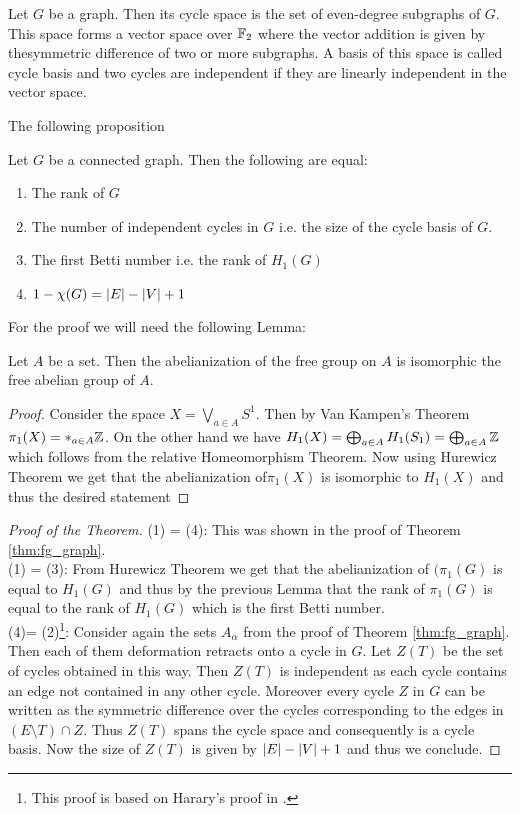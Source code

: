\begin{definition}
	Let $G$ be a graph. Then its cycle space is the set of even-degree subgraphs of $G$. 
	This space forms a vector space over $\mathbb{F}_2$ where the vector addition is given by thesymmetric difference of two or more subgraphs.
	A basis of this space is called cycle basis and two cycles are independent if they are linearly independent in the vector space.
\end{definition}

The following proposition 
\begin{proposition}\label{prop:rank}
	Let $G$ be a connected graph. Then the following are equal:
	\begin{enumerate}
		\item The rank of $G$
		\item The number of independent cycles in $G$ i.e. the size of the cycle basis of $G$.
		\item The first Betti number i.e. the rank of $H_{1}(G)$
		\item $1 - \chi(G) = \abs{E} - \abs{V} + 1$
	\end{enumerate}
\end{proposition}

For the proof we will need the following Lemma:
\begin{lemma}
	Let $A$ be a set. Then the abelianization of the free group on $A$ is isomorphic the free abelian group of $A$.
\end{lemma}

\begin{proof}
	Consider the space $X = \bigvee_{a \in A} S^{1}$. Then by Van Kampen's Theorem $\pi_1(X) = *_{a \in A} \mathbb{Z}$.
	On the other hand we have $H_1(X) = \bigoplus_{a \in A} H_1(S_1) = \bigoplus_{a \in A} \mathbb{Z}$ which follows from the relative Homeomorphism Theorem.
	Now using Hurewicz Theorem we get that the abelianization of$\pi_1(X)$ is isomorphic to $H_1(X)$ and thus the desired statement
\end{proof}

\begin{proof}[Proof of the Theorem]
	(1) = (4): This was shown in the proof of Theorem \ref{thm:fg_graph}.\\
	(1) = (3): From Hurewicz Theorem we get that the abelianization of $(\pi_{1}(G)$ is equal to $H_{1}(G)$
	and thus by the previous Lemma that the rank of $\pi_1(G)$ is equal to the rank of $H_1(G)$ which is the first Betti number.\\
	(4)= (2)\footnote{This proof is based on Harary's proof in \cite[p. 37-40]{harary69}.}:
		Consider again the sets $A_{\alpha}$ from the proof of Theorem \ref{thm:fg_graph}. Then each of them deformation retracts onto a cycle in $G$.
	Let $Z(T)$ be the set of cycles obtained in this way. Then  $Z(T)$ is independent as each cycle contains an edge not contained in any other cycle.
	Moreover every cycle $Z$ in $G$ can be written as the symmetric difference over the cycles corresponding to the edges in $(E \setminus T) \cap Z$.
	Thus $Z(T)$ spans the cycle space and consequently is a cycle basis. Now the size of $Z(T)$ is given by $\abs{E} - \abs{V} + 1$ and thus we conclude.
\end{proof}

